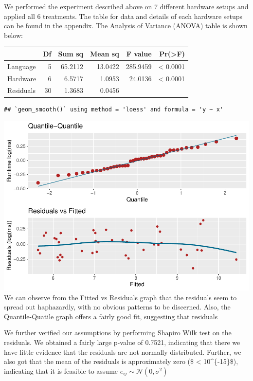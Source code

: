 \documentclass[12pt,halfline,a4paper,]{ouparticle}
\begin{document}
We performed the experiment described above on 7 different hardware
setups and applied all 6 treatments. The table for data and details of
each hardware setups can be found in the appendix. The Analysis of
Variance (ANOVA) table is shown below:

\begin{longtable}[]{@{}lrrrrr@{}}
\toprule\noalign{}
& Df & Sum sq & Mean sq & F value & Pr(\textgreater F) \\
\midrule\noalign{}
\endhead
\bottomrule\noalign{}
\endlastfoot
Language & 5 & 65.2112 & 13.0422 & 285.9459 & \textless{} 0.0001 \\
Hardware & 6 & 6.5717 & 1.0953 & 24.0136 & \textless{} 0.0001 \\
Residuals & 30 & 1.3683 & 0.0456 & & \\
\end{longtable}

\begin{verbatim}
## `geom_smooth()` using method = 'loess' and formula = 'y ~ x'
\end{verbatim}

\includegraphics[width=1\linewidth]{skeleton_files/figure-latex/tableAnova-1}
We can observe from the Fitted vs Residuals graph that the residuals
seem to spread out haphazardly, with no obvious patterns to be
discerned. Also, the Quantile-Quatile graph offers a fairly good fit,
suggesting that residuals

We further verified our assumptions by performing Shapiro Wilk test on
the residuals. We obtained a fairly large p-value of 0.7521, indicating
that there we have little evidence that the residuals are not normally
distributed. Further, we also got that the mean of the residuals is
approximately zero (\$ \textless{} 10\^{}\{-15\}\$), indicating that it
is feasible to assume \(e_{ij} \sim \mathcal{N}(0, \sigma^2)\)
\end{document}
